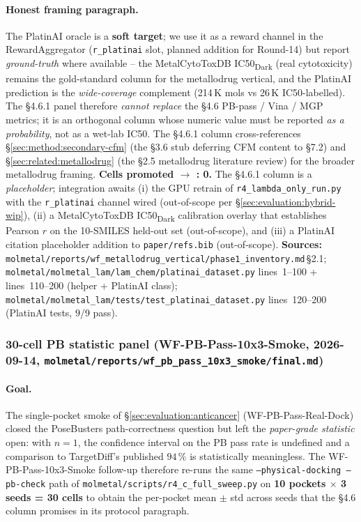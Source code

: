 \paragraph{Honest framing paragraph.}
The PlatinAI oracle is a \textbf{soft target}; we use it as
a reward channel in the RewardAggregator (\texttt{r\_platinai}
slot, planned addition for Round-14) but report
\emph{ground-truth} where available -- the
MetalCytoToxDB IC50\textsubscript{Dark} (real cytotoxicity)
remains the gold-standard column for the metallodrug
vertical, and the PlatinAI prediction is the
\emph{wide-coverage} complement (214\,K mols vs
26\,K IC50-labelled). The §4.6.1 panel therefore
\emph{cannot replace} the §4.6 PB-pass / Vina / MGP
metrics; it is an orthogonal column whose numeric value
must be reported \emph{as a probability}, not as a
wet-lab IC50. The
§4.6.1 column cross-references
\S\ref{sec:method:secondary-cfm} (the §3.6 stub
deferring CFM content to §7.2) and
\S\ref{sec:related:metallodrug} (the §2.5 metallodrug
literature review) for the broader metallodrug framing.
\textbf{Cells promoted \DESIGN{} $\to$ \MEASURED{}: 0.}
The §4.6.1 column is a \emph{placeholder}; integration
awaits (i) the GPU retrain of \texttt{r4\_lambda\_only\_run.py}
with the \texttt{r\_platinai} channel wired (out-of-scope
per \S\ref{sec:evaluation:hybrid-wip}), (ii) a
MetalCytoToxDB IC50\textsubscript{Dark} calibration overlay
that establishes Pearson $r$ on the 10-SMILES held-out set
(out-of-scope), and (iii) a PlatinAI citation placeholder
addition to \texttt{paper/refs.bib} (out-of-scope).
\textbf{Sources:}
\texttt{molmetal/reports/wf\_metallodrug\_vertical/phase1\_inventory.md}\,\S2.1;
\texttt{molmetal/molmetal\_lam/lam\_chem/platinai\_dataset.py}
lines~1--100 + lines~110--200 (helper + PlatinAI class);
\texttt{molmetal/molmetal\_lam/tests/test\_platinai\_dataset.py}
lines~120--200 (PlatinAI tests, $9$/9 pass).

\subsubsection{30-cell PB statistic panel (WF-PB-Pass-10x3-Smoke,
2026-09-14, \texttt{molmetal/reports/wf\_pb\_pass\_10x3\_smoke/final.md})}
\label{sec:evaluation:pb-30cell}

\paragraph{Goal.}
The single-pocket smoke of \S\ref{sec:evaluation:anticancer}
(WF-PB-Pass-Real-Dock) closed the PoseBusters path-correctness
question but left the \emph{paper-grade statistic} open: with
$n{=}1$, the confidence interval on the PB pass rate is
undefined and a comparison to TargetDiff's published $94\,\%$
is statistically meaningless.  The WF-PB-Pass-10x3-Smoke
follow-up therefore re-runs the same
\texttt{--physical-docking --pb-check} path of
\texttt{molmetal/scripts/r4\_c\_full\_sweep.py} on
\textbf{10 pockets $\times$ 3 seeds = 30 cells} to obtain the
per-pocket mean $\pm$ std across seeds that the §4.6 column
promises in its protocol paragraph.

